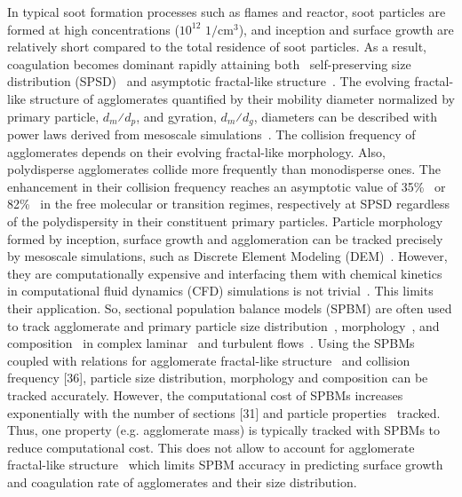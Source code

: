 In typical soot formation processes such as flames and reactor, soot particles are formed at high concentrations ($\mathrm{10^{12}}$ $\mathrm{1/cm^3}$), and inception and surface growth are relatively short compared to the total residence of soot particles. As a result, coagulation becomes dominant rapidly attaining both~\citep{Goudeli2016}
self-preserving size distribution (SPSD)~\citep{lai1972self} and asymptotic fractal-like structure~\citep{mountain1986simulation}.
The evolving fractal-like structure of agglomerates quantified by their mobility diameter normalized by primary particle, $d_m$⁄$d_p$, and gyration, $d_m$⁄$d_g$, diameters can be described with power laws derived from mesoscale simulations~\citep{Kelesidis2017}. The collision frequency of agglomerates depends on their evolving fractal-like morphology. Also, polydisperse agglomerates collide more frequently than monodisperse ones. The enhancement in their collision frequency reaches an asymptotic value of 35\%~\citep{Goudeli2016} or 82\%~\citep{kelesidis2021self} in the free molecular or transition regimes, respectively at SPSD regardless of the polydispersity in their constituent primary particles. Particle morphology formed by inception, surface growth and agglomeration can be tracked precisely by mesoscale simulations, such as Discrete Element Modeling (DEM)~\citep{Kelesidis2017Flame}. However, they are computationally expensive and interfacing them with chemical kinetics in computational fluid dynamics (CFD) simulations is not trivial~\citep{kelesidis2021perspective}. This limits their application. So, sectional population balance models (SPBM) are often used to track agglomerate and primary particle size distribution~\citep{Xiong1993}, morphology~\citep{park2005aerosol}, and composition~\citep{kholghy2016core} in complex laminar~\citep{kholghy2016core} and turbulent flows~\citep{schiener2019transported}. Using the SPBMs coupled with relations for agglomerate fractal-like structure~\citep{matsoukas1991dynamics} and collision frequency [36], particle size distribution, morphology and composition can be tracked accurately. However, the computational cost of SPBMs increases exponentially with the number of sections [31] and particle properties~\citep{kholghy2016core} tracked. Thus, one property (e.g. agglomerate mass) is typically tracked with SPBMs to reduce computational cost. This does not allow to account for agglomerate fractal-like structure~\citep{smooke2005soot, aubagnac2018soot} which limits SPBM accuracy in predicting surface growth and coagulation rate of agglomerates and their size distribution.

